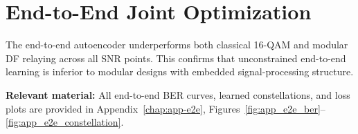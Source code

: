 \section{End-to-End Joint Optimization}
\label{sec:end-to-end}

The end-to-end autoencoder underperforms both classical 16-QAM and modular DF relaying across all SNR points.
This confirms that unconstrained end-to-end learning is inferior to modular designs with embedded signal-processing structure.

\textbf{Relevant material:}
All end-to-end BER curves, learned constellations, and loss plots are provided in
Appendix~\ref{chap:app-e2e},
Figures~\ref{fig:app_e2e_ber}--\ref{fig:app_e2e_constellation}.